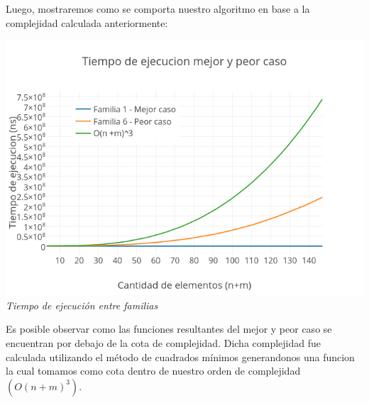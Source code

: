 Luego, mostraremos como se comporta nuestro algoritmo en base a la complejidad calculada anteriormente:

\vspace*{0.3cm} \vspace*{0.3cm}
  \begin{center}
\includegraphics[scale=0.60]{./EJ2/mejorcaso.png}
\\{\textit{Tiempo de ejecución entre familias}}
  \end{center}
  \vspace*{0.3cm}
  
  
Es posible observar como las funciones resultantes del mejor y peor caso se encuentran por debajo de la cota de complejidad. Dicha complejidad fue calculada utilizando el m\'etodo de cuadrados m\'inimos generandonos una funcion la cual tomamos como cota dentro de nuestro orden de complejidad $(O(n+m)^3)$.